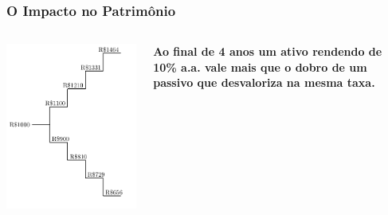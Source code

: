 \begin{frame}[c]\frametitle{O Impacto no Patrimônio}
  \begin{columns}
    \begin{column}{0.5\textwidth}
      \includegraphics[width=\textwidth]{figuras/dobra4.pdf}
    \end{column}
    \begin{column}{0.5\textwidth}
      \centering
      \textbf{\large Ao final de 4 anos um ativo rendendo de 10\% a.a. vale mais que o dobro de um passivo que desvaloriza na mesma taxa.}
    \end{column}
  \end{columns}
\end{frame}

